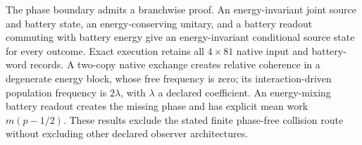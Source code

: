 The phase boundary admits a branchwise proof. An energy-invariant joint
source and battery state, an energy-conserving unitary, and a battery
readout commuting with battery energy give an energy-invariant conditional
source state for every outcome. Exact execution retains all $4\times81$
native input and battery-word records. A two-copy native exchange creates
relative coherence in a degenerate energy block, whose free frequency is
zero; its interaction-driven population frequency is $2\lambda$, with
$\lambda$ a declared coefficient. An energy-mixing battery readout creates
the missing phase and has explicit mean work $m(p-1/2)$. These results
exclude the stated finite phase-free collision route without excluding
other declared observer architectures.
